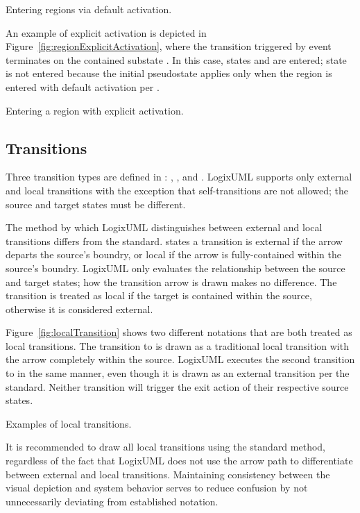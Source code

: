                {Entering regions via default activation.}

An example of explicit activation is depicted in
Figure~\ref{fig:regionExplicitActivation}, where the transition triggered
by event  terminates on the contained substate
. In this case, states  and
 are entered;
state  is not entered because the initial pseudostate
applies only when the region is entered with default activation per
\textcite[\S14.2.3.7]{OMGUML}.

               {Entering a region with explicit activation.}


\subsection{Transitions}

Three transition types are defined in \textcite[\S14.2.3.8.1]{OMGUML}:
, ,
and . LogixUML supports only external and local
transitions with the exception that self-transitions are not allowed; the
source and target states must be different.

The method by which LogixUML distinguishes between external and local
transitions differs from the standard. \textcite[\S14.2.4.9]{OMGUML}
states a transition is external if the arrow departs the source's
boundry, or local if the arrow is fully-contained within the source's boundry.
LogixUML only evaluates the relationship between the source and target states;
how the transition arrow is drawn makes no difference. The transition is
treated as local if the target is contained within the source, otherwise
it is considered external.

Figure~\ref{fig:localTransition} shows two different notations that are both
treated as local transitions. The transition to  is drawn
as a traditional local transition with the arrow completely within the
source. LogixUML executes the second transition to  in the
same manner, even though it is drawn as an external transition per the
standard. Neither transition will trigger the exit action of their
respective source states.

               {Examples of local transitions.}

It is recommended to draw all local transitions using the standard method,
regardless of the fact that LogixUML does not use the arrow path
to differentiate between external and local transitions. Maintaining
consistency between the visual depiction and system behavior serves to
reduce confusion by not unnecessarily deviating from established
notation.

